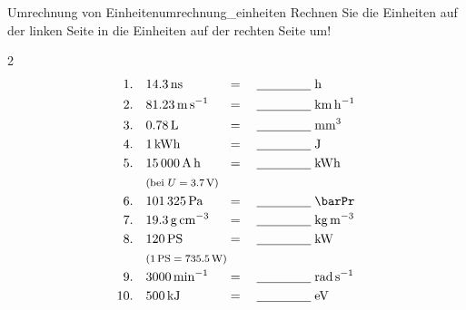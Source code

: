 \documentclass[ngerman]{scrreprt}
\begin{document}
\begin{aufgabebox}{Umrechnung von Einheiten}{umrechnung_einheiten}
Rechnen Sie die Einheiten auf der linken Seite in die Einheiten auf der rechten Seite um!
\begin{multicols}{2}
\setlength{\jot}{8pt}
\allowdisplaybreaks
\begin{alignat*}{2}
    \text{1.} \quad & \SI{14,3}{\nano\second} &&=\quad \underline{\hspace{1.5cm}}\; \si{\hour} \\
    \text{2.} \quad & \SI{81,23}{\meter\per\second} &&=\quad \underline{\hspace{1.5cm}} \;\si{\kilo\meter\per\hour} \\
    \text{3.} \quad & \SI{0,78}{\litre} &&=\quad \underline{\hspace{1.5cm}} \;\si{\milli\meter\cubed} \\
    \text{4.} \quad & \SI{1}{\kWh} &&=\quad \underline{\hspace{1.5cm}} \;\si{\joule} \\
    \text{5.} \quad & \SI[product-units=repeat]{15000}{\ampere\hour} &&=\quad \underline{\hspace{1.5cm}} \;\si{\kWh} \\
    & \multicolumn{2}{l}{\footnotesize{(bei $U = \SI{3,7}{\volt}$)}} \\
    \text{6.} \quad & \SI{101325}{\pascal} &&=\quad \underline{\hspace{1.5cm}} \;\si{\barPr} \\
    \text{7.} \quad & \SI{19,3}{\gram\per\centi\meter\cubed} &&=\quad \underline{\hspace{1.5cm}} \;\si{\kilo\gram\per\meter\cubed} \\
    \text{8.} \quad & 120\,\text{PS} &&=\quad \underline{\hspace{1.5cm}} \;\si{\kilo\watt} \\
    & \multicolumn{2}{l}{\footnotesize{($1\,\text{PS} = \SI{735.5}{\watt}$)}} \\
    \text{9.} \quad & \SI{3000}{\per\minute} &&=\quad \underline{\hspace{1.5cm}} \;\si{\radian\per\second} \\
    \text{10.} \quad & \SI{500}{\kilo\joule} &&=\quad \underline{\hspace{1.5cm}} \;\si{\electronvolt} 
\end{alignat*}
\end{multicols}
\end{aufgabebox}
\end{document}
